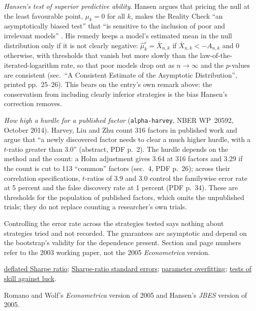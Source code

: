 \begin{qfmethod}
\emph{Hansen's test of superior predictive ability}. Hansen argues that pricing the null at the least favourable point, $\mu_k=0$ for all $k$, makes the Reality Check ``an asymptotically biased test'' that ``is sensitive to the inclusion of poor and irrelevant models'' \citep[abstract and sec.~1, PDF pp.~2--3]{hansen-spa-2001-wp}. His remedy keeps a model's estimated mean in the null distribution only if it is not clearly negative: $\hat\mu^c_k=\bar X_{n,k}$ if $\bar X_{n,k}<-A_{n,k}$ and $0$ otherwise, with thresholds that vanish but more slowly than the law-of-the-iterated-logarithm rate, so that poor models drop out as $n\to\infty$ and the $p$-values are consistent (sec.~``A Consistent Estimate of the Asymptotic Distribution'', printed pp.~25--26). This bears on the entry's own remark above: the conservatism from including clearly inferior strategies is the bias Hansen's correction removes.

\emph{How high a hurdle for a published factor} (\nolinkurl{alpha-harvey}, NBER WP~20592, October 2014). Harvey, Liu and Zhu count 316 factors in published work and argue that ``a newly discovered factor needs to clear a much higher hurdle, with a $t$-ratio greater than 3.0'' (abstract, PDF p.~2). The hurdle depends on the method and the count: a Holm adjustment gives 3.64 at 316 factors and 3.29 if the count is cut to 113 ``common'' factors (sec.~4, PDF p.~26); across their correlation specifications, $t$-ratios of 3.9 and 3.0 control the familywise error rate at 5 percent and the false discovery rate at 1 percent (PDF p.~34). These are thresholds for the population of published factors, which omits the unpublished trials; they do not replace counting a researcher's own trials.

 Controlling the error rate across the strategies tested says nothing about strategies tried and not recorded. The guarantees are asymptotic and depend on the bootstrap's validity for the dependence present. Section and page numbers refer to the 2003 working paper, not the 2005 \emph{Econometrica} version.

 \hyperref[meth:deflated-sharpe-ratio]{deflated Sharpe ratio}; \hyperref[meth:sharpe-ratio-standard-error]{Sharpe-ratio standard errors}; \hyperref[pit:parameter-overfitting]{parameter overfitting}; \hyperref[meth:skill-luck-significance-tests]{tests of skill against luck}.

 Romano and Wolf's \emph{Econometrica} version of 2005 and Hansen's \emph{JBES} version of 2005.

\end{qfmethod}
